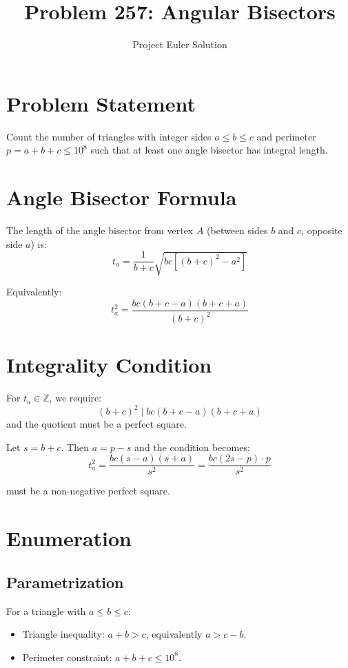 \documentclass[12pt]{article}
\title{Problem 257: Angular Bisectors}
\author{Project Euler Solution}
\date{}
\begin{document}
\maketitle

\section{Problem Statement}

Count the number of triangles with integer sides $a \le b \le c$ and perimeter $p = a+b+c \le 10^8$ such that at least one angle bisector has integral length.

\section{Angle Bisector Formula}

The length of the angle bisector from vertex $A$ (between sides $b$ and $c$, opposite side $a$) is:
\[
t_a = \frac{1}{b+c}\sqrt{bc\left[(b+c)^2 - a^2\right]}
\]

Equivalently:
\[
t_a^2 = \frac{bc(b+c-a)(b+c+a)}{(b+c)^2}
\]

\section{Integrality Condition}

For $t_a \in \mathbb{Z}$, we require:
\[
(b+c)^2 \mid bc(b+c-a)(b+c+a)
\]
and the quotient must be a perfect square.

Let $s = b+c$. Then $a = p - s$ and the condition becomes:
\[
t_a^2 = \frac{bc(s-a)(s+a)}{s^2} = \frac{bc(2s-p) \cdot p}{s^2}
\]

must be a non-negative perfect square.

\section{Enumeration}

\subsection{Parametrization}

For a triangle with $a \le b \le c$:
\begin{itemize}
    \item Triangle inequality: $a + b > c$, equivalently $a > c - b$.
    \item Perimeter constraint: $a + b + c \le 10^8$.
\end{itemize}
\end{document}
